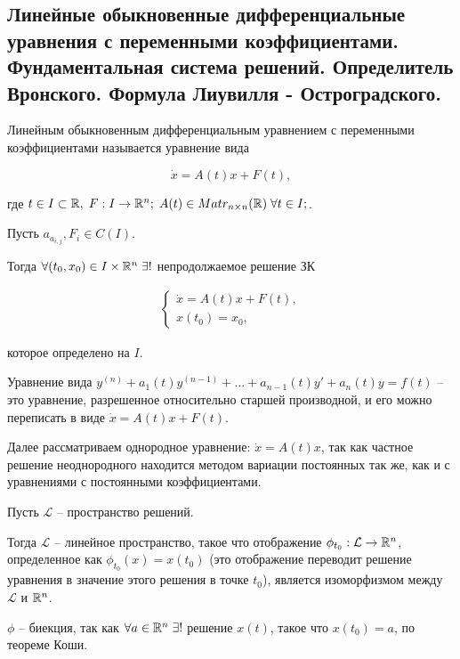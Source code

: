 \subsection{Линейные обыкновенные дифференциальные уравнения с переменными коэффициентами. Фундаментальная система решений. Определитель Вронского. Формула Лиувилля - Остроградского.}

\Def Линейным обыкновенным дифференциальным уравнением с переменными коэффициентами называется уравнение вида

\begin{equation}
    \dot{x} = A(t)x + F(t),
\end{equation}

где $t \in I \subset \mathbb{R}, \; F:I \rightarrow \mathbb{R}^n;\; A(t) \in Matr_{n \times n}(\mathbb{R}) \; \forall t \in I;$.

Пусть $a_{a_{i,j}}, F_i \in C(I)$.

Тогда $\forall (t_0, x_0) \in I \times \mathbb{R}^n \; \exists!$ непродолжаемое решение ЗК

\begin{align*}
    \begin{cases}
        \dot{x} = A(t)x + F(t), \\
        x(t_0) = x_0,
    \end{cases}
\end{align*}

которое определено на $I$.

\Remind Уравнение вида $y^{(n)} + a_1(t)y^{(n-1)} + \dots + a_{n-1}(t)y' + a_n(t)y = f(t)$ -- это уравнение, разрешенное относительно старшей производной, и его можно переписать в виде $\dot{x} = A(t)x + F(t)$.

Далее рассматриваем однородное уравнение: $\dot{x} = A(t)x$, так как частное решение неоднородного находится методом вариации постоянных так же, как и с уравнениями с постоянными коэффициентами.


Пусть $\mathcal{L}$ -- пространство решений.

Тогда $\mathcal{L}$ -- линейное пространство, такое что отображение $\phi_{t_0}:\mathcal{L} \rightarrow \mathbb{R}^n$, определенное как $\phi_{t_0}(x) = x(t_0)$ (это отображение переводит решение уравнения в значение этого решения в точке $t_0$), является изоморфизмом между $\mathcal{L}$ и $\mathbb{R}^n$.

\Proof

$\phi$ -- биекция, так как $\forall a\in \mathbb{R}^n \;\exists!$ решение $x(t)$, такое что $x(t_0) = a$, по теореме Коши.

